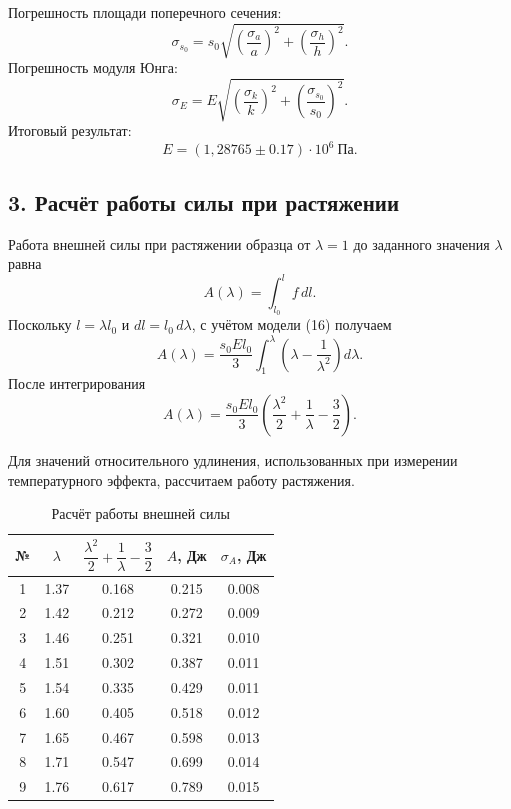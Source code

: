 \documentclass[12pt,a4paper]{article}
\numberwithin{equation}{section}
\newcommand{\compactTableStyle}{%
    \footnotesize
    \renewcommand{\arraystretch}{1.15}%
}
\begin{document}
Погрешность площади поперечного сечения:
\[
    \sigma_{s_0}
    =
    s_0\sqrt{
        \left(\frac{\sigma_a}{a}\right)^2+
        \left(\frac{\sigma_h}{h}\right)^2
    }.
\]
Погрешность модуля Юнга:
\[
    \sigma_E
    =
    E\sqrt{
        \left(\frac{\sigma_k}{k}\right)^2+
        \left(\frac{\sigma_{s_0}}{s_0}\right)^2
    }.
\]
Итоговый результат:
\[
    \boxed{
        E=(1{,}28765 \pm 0.17)\cdot10^6\ \text{Па}
    }.
\]

\subsection*{3. Расчёт работы силы при растяжении}

Работа внешней силы при растяжении образца от $\lambda=1$ до заданного значения $\lambda$ равна
\[
    A(\lambda)=\int_{l_0}^{l}f\,dl.
\]
Поскольку $l=\lambda l_0$ и $dl=l_0\,d\lambda$, с учётом модели (16) получаем
\[
    A(\lambda)
    =
    \frac{s_0El_0}{3}
    \int_1^\lambda
    \left(\lambda-\frac{1}{\lambda^2}\right)d\lambda.
\]
После интегрирования
\[
    \boxed{
    A(\lambda)
    =
    \frac{s_0El_0}{3}
    \left(
        \frac{\lambda^2}{2}
        +\frac{1}{\lambda}
        -\frac{3}{2}
    \right)}.
\]

Для значений относительного удлинения, использованных при измерении температурного эффекта, рассчитаем работу растяжения.

\begin{table}[H]
    \centering
    \caption{Расчёт работы внешней силы}
    \compactTableStyle
    \begin{tabular}{|c|c|c|c|c|}
        \hline
        № & $\lambda$ &
        $\dfrac{\lambda^2}{2}+\dfrac{1}{\lambda}-\dfrac{3}{2}$ &
        $A$, Дж & $\sigma_A$, Дж \\
        \hline
        1 & 1.37 & 0.168 & 0.215 & 0.008 \\
        \hline
        2 & 1.42 & 0.212 & 0.272 & 0.009 \\
        \hline
        3 & 1.46 & 0.251 & 0.321 & 0.010 \\
        \hline
        4 & 1.51 & 0.302 & 0.387 & 0.011 \\
        \hline
        5 & 1.54 & 0.335 & 0.429 & 0.011 \\
        \hline
        6 & 1.60 & 0.405 & 0.518 & 0.012 \\
        \hline
        7 & 1.65 & 0.467 & 0.598 & 0.013 \\
        \hline
        8 & 1.71 & 0.547 & 0.699 & 0.014 \\
        \hline
        9 & 1.76 & 0.617 & 0.789 & 0.015 \\
        \hline
    \end{tabular}
\end{table}
\end{document}
